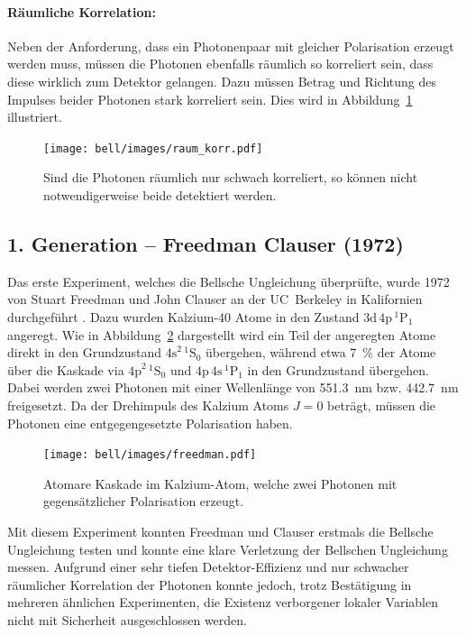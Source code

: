 \begin{refsection}
\paragraph{R\"aumliche Korrelation:}
Neben der Anforderung, dass ein Photonenpaar mit gleicher Polarisation erzeugt
werden muss, m\"ussen die Photonen ebenfalls r\"aumlich so korreliert sein,
dass diese wirklich zum Detektor gelangen.
Dazu m\"ussen Betrag und Richtung des Impulses beider Photonen stark korreliert
sein. Dies wird in Abbildung~\ref{fig:bell:raum_korr} illustriert.

\begin{figure}
    \centering
    \texttt{[image: bell/images/raum\_korr.pdf]}
    \caption{Sind die Photonen r\"aumlich nur schwach korreliert,
    so k\"onnen nicht notwendigerweise beide detektiert werden.}
    \label{fig:bell:raum_korr}
\end{figure}

\subsection{1. Generation -- Freedman Clauser (1972)}
Das erste Experiment, welches die Bellsche Ungleichung \"uberpr\"ufte,
wurde 1972 von Stuart Freedman und John Clauser an der UC~Berkeley
in Kalifornien durchgef\"uhrt \cite{Bell:Freedman1972}.
Dazu wurden Kalzium-40 Atome in den Zustand $\text{3d}\,\text{4p}\,^1\text{P}_1$
angeregt. 
Wie in Abbildung~\ref{fig:bell:freedman} dargestellt wird ein Teil der
angeregten Atome direkt in den Grundzustand $\text{4s}^2\,^1\text{S}_0$
\"ubergehen, w\"ahrend etwa \SI{7}{\percent} der Atome \"uber die Kaskade
via $\text{4p}^2\,^1\text{S}_0$ und $\text{4p}\,\text{4s}\,^1\text{P}_1$ 
in den Grundzustand \"ubergehen.
Dabei werden zwei Photonen mit einer Wellenl\"ange von \SI{551.3}{\nano\meter}
bzw. \SI{442.7}{\nano\meter} freigesetzt. 
Da der Drehimpuls des Kalzium Atoms $J=0$ betr\"agt, m\"ussen die Photonen
eine entgegengesetzte Polarisation haben.

\begin{figure}
    \centering
    \texttt{[image: bell/images/freedman.pdf]}
    \caption{Atomare Kaskade im Kalzium-Atom, welche zwei Photonen mit
    gegens\"atzlicher Polarisation erzeugt. \cite{Bell:Freedman1972}}
    \label{fig:bell:freedman}
\end{figure}

Mit diesem Experiment konnten Freedman und Clauser erstmals die Bellsche
Ungleichung testen und konnte eine klare Verletzung der Bellschen Ungleichung
messen.
Aufgrund einer sehr tiefen Detektor-Effizienz und nur schwacher r\"aumlicher
Korrelation der Photonen konnte jedoch, trotz Best\"atigung in mehreren 
\"ahnlichen Experimenten, die Existenz verborgener lokaler Variablen nicht
mit Sicherheit ausgeschlossen werden.


\end{refsection}
